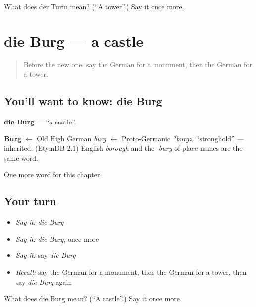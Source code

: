 \begin{tcolorbox}[breakable,colback=teal!4,colframe=teal!35!black,title={Before you move on}]
What does der Turm mean? (\textquotedblleft{}A tower\textquotedblright{}.) Say it once more.
\end{tcolorbox}
\section[die Burg]{die Burg — a castle}

\label{lesson:GE-C195-burg}



\begin{quote}
Before the new one: say the German for a monument, then the German for a tower.
\end{quote}

\subsection*{You'll want to know: die Burg}
\textbf{die Burg} — \textquotedblleft{}a castle\textquotedblright{}.

\begin{cousinweb}
\textbf{Burg} $\leftarrow$ Old High German \emph{burg} $\leftarrow$ Proto-Germanic \emph{*burgz}, \textquotedblleft{}stronghold\textquotedblright{} — inherited. (EtymDB 2.1) English \emph{borough} and the \emph{-bury} of place names are the same word.
\end{cousinweb}

\begin{grammarlens}[title={What you've built}]
One more word for this chapter.
\end{grammarlens}

\subsection*{Your turn}
\begin{itemize}
\raggedright
  \item \emph{Say it:} \emph{die Burg}
  \item \emph{Say it:} \emph{die Burg}, once more
  \item \emph{Say it:} say \emph{die Burg}
  \item \emph{Recall:} say the German for a monument, then the German for a tower, then say \emph{die Burg} again
\end{itemize}

\begin{tcolorbox}[breakable,colback=teal!4,colframe=teal!35!black,title={Before you move on}]
What does die Burg mean? (\textquotedblleft{}A castle\textquotedblright{}.) Say it once more.
\end{tcolorbox}
